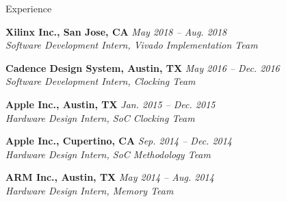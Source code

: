 
\begin{rSection}{Experience}


{\bf Xilinx Inc., San Jose, CA} \hfill {\em May 2018 -- Aug. 2018} \\
\textit{Software Development Intern, Vivado Implementation Team}
    
{\bf Cadence Design System, Austin, TX} \hfill {\em May 2016 -- Dec. 2016} \\
\textit{Software Development Intern, Clocking Team}

{\bf Apple Inc., Austin, TX} \hfill {\em Jan. 2015 -- Dec. 2015} \\
\textit{Hardware Design Intern, SoC Clocking Team}

{\bf Apple Inc., Cupertino, CA} \hfill {\em Sep. 2014 -- Dec. 2014} \\
\textit{Hardware Design Intern, SoC Methodology Team}

{\bf ARM Inc., Austin, TX} \hfill {\em May 2014 -- Aug. 2014} \\
\textit{Hardware Design Intern, Memory Team}


\end{rSection}


